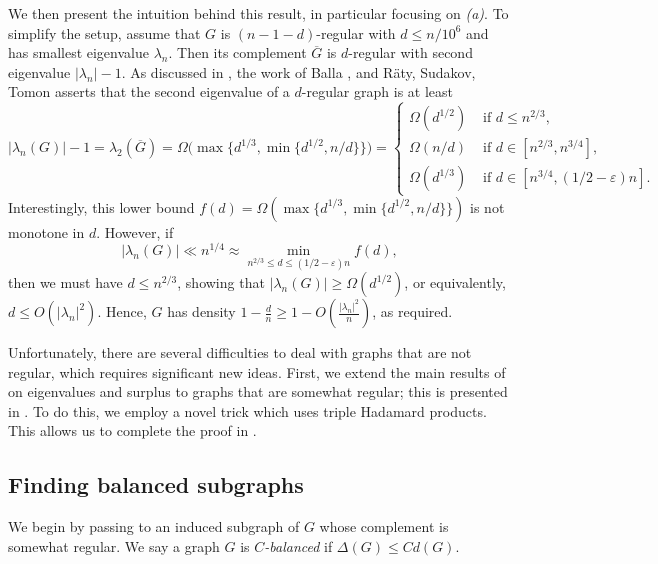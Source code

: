\documentclass[11pt]{article}
\theoremstyle{plain}
\theoremstyle{definition}
\newcommand{\eps}{\varepsilon}
\begin{document}
We then present the intuition behind this result, in particular focusing on \textit{(a)}. 
To simplify the setup, assume that $G$ is $(n-1-d)$-regular with $d\leq n/10^6$ and has smallest eigenvalue $\lambda_n$. 
Then its complement $\overline{G}$ is $d$-regular with second eigenvalue $|\lambda_n|-1$. 
As discussed in , the work of Balla \cite{Balla21}, and R\"aty, Sudakov, Tomon \cite{BRST,RST} asserts that the second eigenvalue of a $d$-regular graph is at least 
\[
    |\lambda_n(G)|-1
    =\lambda_2(\overline{G})
    =\Omega\Big(\max\big\{d^{1/3},\min\{d^{1/2},n/d\}\big\}\Big)
    =   \begin{cases}\Omega(d^{1/2}) &\mbox{ if } d\leq n^{2/3},\\
            \Omega(n/d) &\mbox{ if } d\in [n^{2/3},n^{3/4}],\\
            \Omega(d^{1/3}) &\mbox{ if } d\in [n^{3/4},(1/2-\eps)n].
        \end{cases}
\]
Interestingly, this lower bound $f(d)=\Omega(\max\{d^{1/3},\min\{d^{1/2},n/d\}\})$ is not monotone in $d$. 
However, if $$|\lambda_n(G)|\ll n^{1/4}\approx \min_{n^{2/3}\leq d\leq (1/2-\eps)n} f(d),$$ then we must have $d\leq n^{2/3}$, showing that $|\lambda_n(G)|\geq \Omega(d^{1/2})$, or equivalently, $d\leq O(|\lambda_n|^2)$. 
Hence, $G$ has density $1-\frac{d}{n}\geq 1-O(\frac{|\lambda_n|^2}{n})$, as required. 

Unfortunately, there are several difficulties to deal with graphs that are not regular, which requires significant new ideas.
First, we extend the main results of \cite{RST} on eigenvalues and surplus to graphs that are somewhat regular; this is presented in . To do this, we employ a novel trick which uses triple Hadamard products.
This allows us to complete the proof in .


\subsection{Finding balanced subgraphs} \label{subsec: regularisation}

We begin by passing to an induced subgraph of $G$ whose complement is somewhat regular. 
We say a graph $G$ is \emph{$C$-balanced} if $\Delta(G)\leq Cd(G)$.
\end{document}
